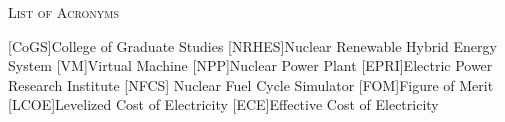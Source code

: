 \documentclass[12pt]{UIdahoMastersThesis}
\begin{document}


\tableofcontents
\newpage








\begin{center}
	{\LARGE\textsc{List of Acronyms}}
\end{center}

\begin{acronym}[NRHES]  %
    [CoGS]{College of Graduate Studies}
    [NRHES]{Nuclear Renewable Hybrid Energy System}
    [VM]{Virtual Machine}  %
    [NPP]{Nuclear Power Plant}
    [EPRI]{Electric Power Research Institute}
    [NFCS] {Nuclear Fuel Cycle Simulator}
    [FOM]{Figure of Merit}
    [LCOE]{Levelized Cost of Electricity}
    [ECE]{Effective Cost of Electricity}
\end{acronym}



\mainmatter  %
\setcounter{secnumdepth}{3}  %
\end{document}
